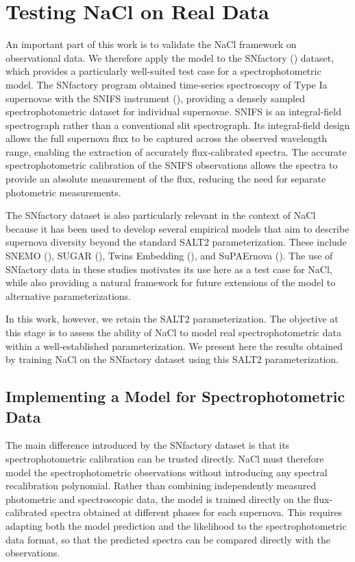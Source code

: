 \section{Testing NaCl on Real Data} \label{sec:nacl_real_data}

An important part of this work is to validate the NaCl framework on observational data. We therefore apply the model to the SNfactory (\cite{snfactory}) 
dataset, which provides a particularly well-suited test case for a spectrophotometric model. The SNfactory program obtained time-series 
spectroscopy of Type Ia supernovae with the SNIFS instrument (\cite{Lantz_2004}), providing a densely sampled spectrophotometric dataset for individual 
supernovae. 
SNIFS is an integral-field spectrograph rather than a conventional slit spectrograph. Its integral-field design  
allows the full supernova flux to be captured across the observed wavelength range, enabling the extraction of accurately flux-calibrated spectra. 
The accurate spectrophotometric calibration of the SNIFS observations allows the spectra to provide an absolute measurement of the flux, 
reducing the need for separate photometric measurements. 

The SNfactory dataset is also particularly relevant in the context of NaCl because it has been used to develop several empirical models that 
aim to describe supernova diversity beyond the standard SALT2 parameterization. These include SNEMO 
(\cite{Saunders_2018_SNEMO}), SUGAR (\cite{L_get_2020_SUGAR}), Twins Embedding (\cite{Boone_2021_twins_embedding}), and SuPAErnova 
(\cite{Stein_2022_PAE}). The use of SNfactory data in these studies motivates its use here as a test case for NaCl, while also providing a 
natural framework for future extensions of the model to alternative parameterizations.

In this work, however, we retain the SALT2 parameterization. The objective at this stage is to assess the 
ability of NaCl to model real spectrophotometric data within a well-established parameterization. 
We present here the results obtained by training NaCl on the SNfactory dataset using this SALT2 
parameterization.

\subsection{Implementing a Model for Spectrophotometric Data}


The main difference introduced by the SNfactory dataset is that its 
spectrophotometric calibration can be trusted directly. NaCl must therefore 
model the spectrophotometric observations without introducing any spectral 
recalibration polynomial. Rather than combining independently measured 
photometric and spectroscopic data, the model is trained directly on the 
flux-calibrated spectra obtained at different phases for each supernova. This 
requires adapting both the model prediction and the likelihood to the 
spectrophotometric data format, so that the predicted spectra can be compared 
directly with the observations. 


